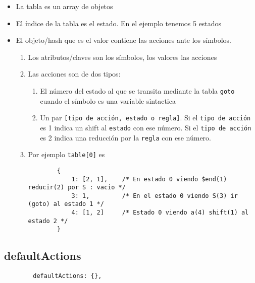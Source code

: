 \begin{itemize}
\item
La tabla es un array de objetos
\item
El índice de la tabla es el estado. En el ejemplo tenemos 5 estados
\item
El objeto/hash que es el valor contiene las acciones ante los símbolos.
\begin{enumerate}
\item
Los atributos/claves son los símbolos, los valores las acciones
\item
Las acciones son de dos tipos:
\begin{enumerate}
\item
El número del estado al que se transita mediante la tabla \verb|goto|
cuando el símbolo es una variable sintactica 
\item
Un par \verb|[tipo de acción, estado o regla]|. 
Si el \verb|tipo de acción| es 1 indica un shift al \verb|estado| con ese número.
Si el \verb|tipo de acción| es 2 indica una reducción por la \verb|regla| con ese número.
\end{enumerate}
\item
Por ejemplo \verb|table[0]| es 
\begin{verbatim}
        {
            1: [2, 1],    /* En estado 0 viendo $end(1) reducir(2) por S : vacio */
            3: 1,         /* En el estado 0 viendo S(3) ir (goto) al estado 1 */
            4: [1, 2]     /* Estado 0 viendo a(4) shift(1) al estado 2 */
        } 
\end{verbatim}
\end{enumerate}


\end{itemize}

\subsection{defaultActions}
\begin{verbatim}
        defaultActions: {},
\end{verbatim}


